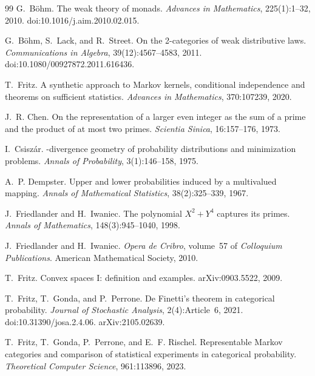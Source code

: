 \documentclass[11pt]{article}
\theoremstyle{definition}
\theoremstyle{remark}
\begin{document}
\begin{thebibliography}{99}
G.~B\"ohm.
\newblock The weak theory of monads.
\newblock \emph{Advances in Mathematics}, 225(1):1--32, 2010.
\newblock doi:10.1016/j.aim.2010.02.015.

G.~B\"ohm, S.~Lack, and R.~Street.
\newblock On the 2-categories of weak distributive laws.
\newblock \emph{Communications in Algebra}, 39(12):4567--4583, 2011.
\newblock doi:10.1080/00927872.2011.616436.

T.~Fritz.
\newblock A synthetic approach to {M}arkov kernels, conditional independence and theorems on
  sufficient statistics.
\newblock \emph{Advances in Mathematics}, 370:107239, 2020.

J.~R. Chen.
\newblock On the representation of a larger even integer as the sum of a prime and the product of at
  most two primes.
\newblock \emph{Scientia Sinica}, 16:157--176, 1973.

I.~Csisz\'ar.
-divergence geometry of probability distributions and minimization problems.
\newblock \emph{Annals of Probability}, 3(1):146--158, 1975.

A.~P. Dempster.
\newblock Upper and lower probabilities induced by a multivalued mapping.
\newblock \emph{Annals of Mathematical Statistics}, 38(2):325--339, 1967.

J.~Friedlander and H.~Iwaniec.
\newblock The polynomial {$X^2+Y^4$} captures its primes.
\newblock \emph{Annals of Mathematics}, 148(3):945--1040, 1998.

J.~Friedlander and H.~Iwaniec.
\newblock \emph{Opera de Cribro}, volume~57 of \emph{Colloquium Publications}.
\newblock American Mathematical Society, 2010.

T.~Fritz.
\newblock Convex spaces {I}: definition and examples.
\newblock arXiv:0903.5522, 2009.

T.~Fritz, T.~Gonda, and P.~Perrone.
\newblock De {F}inetti's theorem in categorical probability.
\newblock \emph{Journal of Stochastic Analysis}, 2(4):Article~6, 2021.
\newblock doi:10.31390/josa.2.4.06. arXiv:2105.02639.

T.~Fritz, T.~Gonda, P.~Perrone, and E.~F. Rischel.
\newblock Representable {M}arkov categories and comparison of statistical experiments in categorical
  probability.
\newblock \emph{Theoretical Computer Science}, 961:113896, 2023.


\end{thebibliography}
\end{document}
